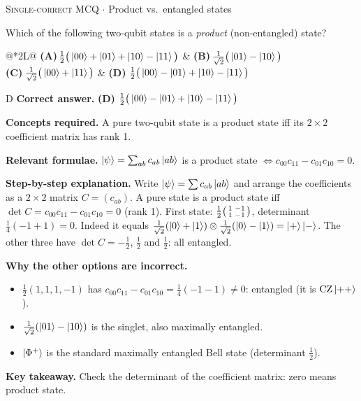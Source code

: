 \documentclass[11pt,a4paper]{article}
\newcommand{\optlabel}[1]{\textbf{(#1)}}
\newcommand{\correctlabel}[1]{\textcolor{okgreen}{\textbf{(#1)}\,\ding{51}}}
\newenvironment{qitem}[1]{\begin{list}{}{\setlength{\leftmargin}{3.3em}\setlength{\labelwidth}{3.1em}%
  \setlength{\labelsep}{0.2em}\setlength{\topsep}{3pt}\setlength{\parsep}{3pt}}\item[\textbf{Q.#1}\hfill]}{\end{list}}
\newcommand{\qsep}{\par\vspace{2pt}{\color{black!15}\hrule}\vspace{4pt}}
\newcommand{\qmeta}[2]{{\footnotesize\color{black!60}\textsc{#1} \;$\cdot$\; #2}\par}
\begin{document}
\begin{qitem}{24}
\qmeta{Single-correct MCQ}{Product vs.\ entangled states}
Which of the following two-qubit states is a \emph{product} (non-entangled) state?
\par\smallskip\noindent\begin{tabularx}{\linewidth}{@{}*{2}{L}@{}}
\optlabel{A}\,$\frac12\big(\ket{00} + \ket{01} + \ket{10} - \ket{11}\big)$ & \optlabel{B}\,$\frac1{\sqrt2}\big(\ket{01} - \ket{10}\big)$ \\[3pt]
\optlabel{C}\,$\frac1{\sqrt2}\big(\ket{00} + \ket{11}\big)$ & \correctlabel{D}\,$\frac12\big(\ket{00} - \ket{01} + \ket{10} - \ket{11}\big)$
\end{tabularx}
\end{qitem}
\begin{solbox}{D}
\textbf{\color{brand}Correct answer.} \textcolor{okgreen}{\textbf{(D)}} $\frac12\big(\ket{00} - \ket{01} + \ket{10} - \ket{11}\big)$

\textbf{\color{brand}Concepts required.} A pure two-qubit state is a product state iff its $2\times2$ coefficient matrix has rank 1.

\textbf{\color{brand}Relevant formulae.} $\ket\psi = \sum_{ab}c_{ab}\ket{ab}$ is a product state $\Leftrightarrow c_{00}c_{11} - c_{01}c_{10} = 0$.

\textbf{\color{brand}Step-by-step explanation.} Write $\ket\psi = \sum c_{ab}\ket{ab}$ and arrange the coefficients as a $2\times2$ matrix $C = (c_{ab})$. A pure state is a
product state iff $\det C = c_{00}c_{11} - c_{01}c_{10} = 0$ (rank 1).
First state: $\frac12\begin{psmallmatrix}1 & -1\\ 1 & -1\end{psmallmatrix}$, determinant $\frac14(-1 + 1) = 0$. Indeed it equals
$\frac{1}{\sqrt2}(\ket0 + \ket1)\otimes\frac{1}{\sqrt2}(\ket0 - \ket1) = \ket+\ket-$. The other three have $\det C = -\frac12$,
$\frac12$ and $\frac12$: all entangled.

\textbf{\color{brand}Why the other options are incorrect.}
\begin{itemize}[leftmargin=2.4em, itemsep=1pt, topsep=2pt]
\item[\textbf{(A)}] $\frac12(1, 1, 1, -1)$ has $c_{00}c_{11} - c_{01}c_{10} = \frac14(-1 - 1) \neq 0$: entangled (it is $\mathrm{CZ}\ket{++}$).
\item[\textbf{(B)}] $\frac{1}{\sqrt2}(\ket{01} - \ket{10})$ is the singlet, also maximally entangled.
\item[\textbf{(C)}] $\ket{\Phi^+}$ is the standard maximally entangled Bell state (determinant $\frac12$).
\end{itemize}
\textbf{\color{brand}Key takeaway.} Check the determinant of the coefficient matrix: zero means product state.
\end{solbox}
\qsep
\end{document}
